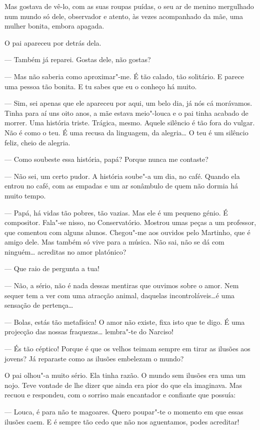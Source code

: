 Mas gostava de vê-lo, com as suas roupas puídas, o seu ar de menino
mergulhado num mundo só dele, observador e atento, às vezes acompanhado
da mãe, uma mulher bonita, embora apagada.

O pai apareceu por detrás dela.

--- Também já reparei. Gostas dele, não gostas?

--- Mas não saberia como aproximar"-me. É tão calado, tão solitário. E
parece uma pessoa tão bonita. E tu sabes que eu o conheço há muito.

--- Sim, sei apenas que ele apareceu por aqui, um belo dia, já nós cá
morávamos. Tinha para aí uns oito anos, a mãe estava meio"-louca e o pai
tinha acabado de morrer. Uma história triste. Trágica, mesmo. Aquele
silêncio é tão fora do vulgar. Não é como o teu. É uma recusa da
linguagem, da alegria\ldots{} O teu é um silêncio feliz, cheio de alegria.

--- Como soubeste essa história, papá? Porque nunca me contaste?

--- Não sei, um certo pudor. A história soube"-a um dia, no café. Quando
ela entrou no café, com as empadas e um ar sonâmbulo de quem não dormia
há muito tempo.

--- Papá, há vidas tão pobres, tão vazias. Mas ele é um pequeno génio. É
compositor. Fala"-se nisso, no Conservatório. Mostrou umas peças a um
professor, que comentou com alguns alunos. Chegou"-me aos ouvidos pelo
Martinho, que é amigo dele. Mas também só vive para a música. Não sai,
não se dá com ninguém\ldots{} acreditas no amor platónico?

--- Que raio de pergunta a tua!

--- Não, a sério, não é nada dessas mentiras que ouvimos sobre o amor. Nem
sequer tem a ver com uma atracção animal, daquelas incontroláveis\ldots{}é
uma sensação de pertença\ldots{}

--- Bolas, estás tão metafísica! O amor não existe, fixa isto que te digo.
É uma projecção das nossas fraquezas\ldots{} lembra"-te do Narciso!

--- És tão céptico! Porque é que os velhos teimam sempre em tirar as
ilusões aos jovens? Já reparaste como as ilusões embelezam o mundo?

O pai olhou"-a muito sério. Ela tinha razão. O mundo sem ilusões era uma
um nojo. Teve vontade de lhe dizer que ainda era pior do que ela
imaginava. Mas recuou e respondeu, com o sorriso mais encantador e
confiante que possuía:

--- Louca, é para não te magoares. Quero poupar"-te o momento em que essas
ilusões caem. E é sempre tão cedo que não nos aguentamos, podes
acreditar!

